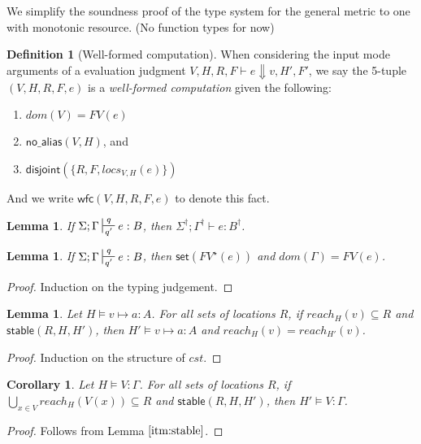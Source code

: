 \documentclass[11pt]{article}
\newcommand{\na}[1]{\mathsf{no\_alias}(#1)}
\newcommand{\stable}[1]{\mathsf{stable}(#1)}
\newcommand{\set}[1]{\mathsf{set}(#1)}
\newcommand{\dist}[1]{\mathsf{disjoint}(#1)}
\newcommand{\wfc}[5]{\mathsf{wfc}(#1,#2,#3,#4,#5)}
\newtheorem{lemma}[theorem]{Lemma}
\newtheorem{corollary}{Corollary}[theorem]
\theoremstyle{definition}
\newtheorem{definition}{Definition}[section]
\begin{document}
We simplify the soundness proof of the type system for the general metric to one with monotonic resource.
(No function types for now)

\begin{definition}[Well-formed computation]
When considering the input mode arguments of a evaluation judgment $V,H,R,F \vdash e \Downarrow v,H',F'$, 
we say the 5-tuple $(V,H,R,F,e)$ is a \emph{well-formed computation} given the following:
\begin{enumerate}
\item $dom(V) = FV(e)$
\item $\na{V,H}$, and
\item $\dist{\{R,F,locs_{V,H}(e)\}}$
\end{enumerate} 
And we write $\wfc{V}{H}{R}{F}{e}$ to denote this fact.
\end{definition}

\begin{lemma}
\label{a} If $\Sigma; \Gamma \sststile{q'}{q} e : B$, then $\Sigma^{\dagger}; \Gamma^{\dagger} \vdash e : B^{\dagger}$.
\end{lemma}

\begin{lemma}\label{itm:linear}
\label{a} If $\Sigma; \Gamma \sststile{q'}{q} e : B$, then $\set{FV^{\star}(e)}$ and $dom(\Gamma) = FV(e)$.
\end{lemma}

\begin{proof}
Induction on the typing judgement.
\end{proof}

\begin{lemma}\label{itm:stable}
Let $H \vDash v \mapsto a : A$. For all sets of locations $R$, if $reach_H(v) \subseteq R$ and $\stable{R,H,H'}$, then $H' \vDash v \mapsto a : A$ and $reach_H(v) = reach_{H'}(v)$.
\end{lemma}

\begin{proof}
Induction on the structure of $cst$.
\end{proof}

\begin{corollary}
Let $H \vDash V : \Gamma$. For all sets of locations $R$, if $\bigcup_{x \in V} reach_H(V(x)) \subseteq R$ and $\stable{R,H,H'}$, then $H' \vDash V : \Gamma$.
\end{corollary}

\begin{proof}
Follows from Lemma $\ref{itm:stable}$.
\end{proof}
\end{document}
